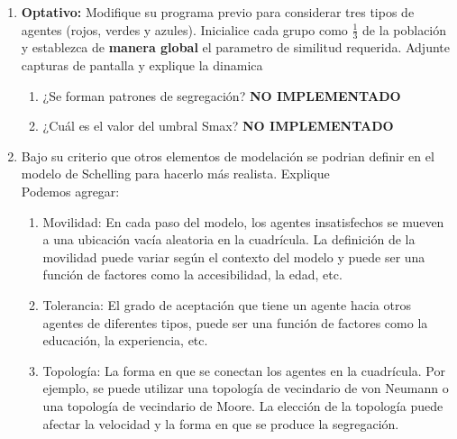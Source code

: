 \documentclass[12pt]{article}
\begin{document}
\begin{enumerate}
\begin{enumerate}
    \end{enumerate}

    \item \textbf{Optativo:} Modifique su programa previo para considerar tres tipos de agentes (rojos, verdes y azules). Inicialice cada grupo como $\frac{1}{3}$ de la población y establezca de \textbf{manera global}
    el parametro de similitud requerida. Adjunte capturas de pantalla y explique la dinamica\\
    \begin{enumerate}
        \item ¿Se forman patrones de segregación? \textbf{NO IMPLEMENTADO}
        \item ¿Cuál es el valor del umbral Smax? \textbf{NO IMPLEMENTADO}
    \end{enumerate}
    \item Bajo su criterio que otros elementos de modelación se podrian definir en el modelo de Schelling para hacerlo más realista. Explique\\
    
    Podemos agregar:\\
    \begin{enumerate}
        \item Movilidad: En cada paso del modelo, los agentes insatisfechos se mueven a una ubicación vacía aleatoria en la cuadrícula. La definición de la movilidad puede variar según el contexto del modelo y puede ser una función de factores como la accesibilidad, la edad, etc.
        \item Tolerancia: El grado de aceptación que tiene un agente hacia otros agentes de diferentes tipos, puede ser una función de factores como la educación, la experiencia, etc.
        \item Topología: La forma en que se conectan los agentes en la cuadrícula. Por ejemplo, se puede utilizar una topología de vecindario de von Neumann o una topología de vecindario de Moore. La elección de la topología puede afectar la velocidad y la forma en que se produce la segregación.
    \end{enumerate}


\end{enumerate}
\end{document}
